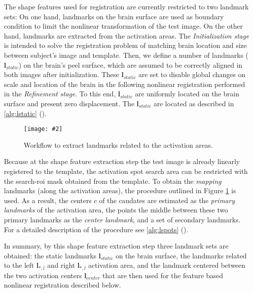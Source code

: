 \documentclass{frontiers}
\newcommand{\insertgraphic}[2]{\texttt{[image: \#2]}}
\newcommand{\cbstart}{\relax}
\newcommand{\cbend}{\relax}
\newcommand{\insertgraphic}[2]{\texttt{[image: \#2]}}
\newcommand{\lm}[1]{\ensuremath{\mathbf{l}_{#1}}}
\begin{document}
\cbstart
The shape features used for registration are currently restricted to two landmark sets:
\cbend
On one hand, landmarks on the brain surface are used as boundary condition to limit the nonlinear 
  transformation of the test image. 
On the other hand, landmarks are extracted from the activation areas. 
\cbstart
The \emph{Initialization stage} is intended to solve the registration problem of matching brain location
  and size between subject's image and template.
Then, we define a number of landmarks (\lm{static}) on the brain's peel surface, which are assumed
  to be correctly aligned in both images after initialization.
These \lm{static} are set to disable global changes on scale and location of the brain in the following
  nonlinear registration performed in the \emph{Refinement stage}.
\cbend
To this end, \lm{static} are uniformly located on the brain surface and present
  zero displacement. The \lm{static} are located as described in \autoref{alg:lstatic} ().

\begin{figure}
\centering
\insertgraphic{width=0.75\linewidth}{figures/03-Segflow}
\caption{ \label{fig:featlmextract} Workflow to extract landmarks related to the activation areas. 
}
\end{figure}

Because at the shape feature extraction step the test image is already linearly registered to the template, 
  the activation spot search area can be restricted with the search-\gls*{roi} mask obtained from the template.
To obtain the \emph{mapping} landmarks (along the activation areas), the procedure
  outlined in Figure \ref{fig:featlmextract} is used.
\cbstart
As a result, the centers $c$ of the caudates are estimated as the \emph{primary landmarks} of the activation area, the points
    the middle between these two primary landmarks as the \emph{center landmark}, and a set of secondary landmarks. 
For a detailed description of the procedure see \autoref{alg:lspots} ().
\cbend

\cbstart
In summary, by this shape feature extraction step three landmark sets are obtained: the static landmarks \lm{static} on the 
\cbend
  brain surface, the landmarks related to the left \lm{*,l} and right \lm{*,l} activation area, 
  and the  landmark centered between the two activation centers \lm{center} that are then used for the 
  feature based nonlinear registration described below.
\end{document}
